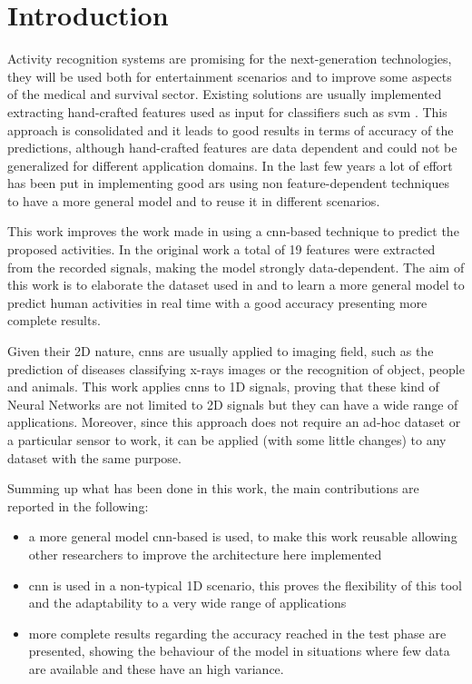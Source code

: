 
\section{Introduction}
\label{sec:introduction}

Activity recognition systems are promising for the next-generation technologies, they will be used both for entertainment scenarios and to improve some aspects of the medical and survival sector.
Existing solutions are usually implemented extracting hand-crafted features used as input for classifiers such as \gls{svm} \cite{Elvira14, Hamalainen11, Khan10}.
This approach is consolidated and it leads to good results in terms of accuracy of the predictions, although hand-crafted features are data dependent and could not be generalized for different application domains.
In the last few years a lot of effort has been put in implementing good \gls{ars} using non feature-dependent techniques to have a more general model and to reuse it in different scenarios.

This work improves the work made in \cite{Frank10} using a \gls{cnn}-based technique to predict the proposed activities.
In the original work a total of 19 features were extracted from the recorded signals, making the model strongly data-dependent.
The aim of this work is to elaborate the dataset used in \cite{Frank10} and to learn a more general model to predict human activities in real time with a good accuracy presenting more complete results.

Given their 2D nature, \glspl{cnn} are usually applied to imaging field, such as the prediction of diseases classifying x-rays images or the recognition of object, people and animals.
This work applies \glspl{cnn} to 1D signals, proving that these kind of Neural Networks are not limited to 2D signals but they can have a wide range of applications.
Moreover, since this approach does not require an ad-hoc dataset or a particular sensor to work, it can be applied (with some little changes) to any dataset with the same purpose.

Summing up what has been done in this work, the main contributions are reported in the following:
\begin{itemize}
\item a more general model \gls{cnn}-based is used, to make this work reusable allowing other researchers to improve the architecture here implemented
\item \gls{cnn} is used in a non-typical 1D scenario, this proves the flexibility of this tool and the adaptability to a very wide range of applications
\item more complete results regarding the accuracy reached in the test phase are presented, showing the behaviour of the model in situations where few data are available and these have an high variance.
\end{itemize}

